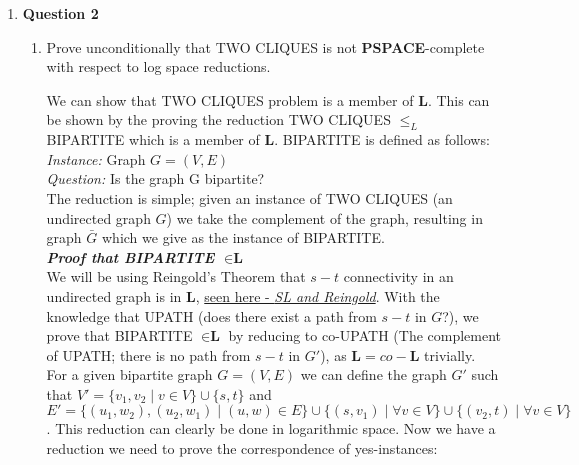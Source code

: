 \documentclass[12pt]{article}
\begin{document}
\begin{enumerate}
\begin{enumerate}
\end{enumerate}
\item \textbf{Question 2}
\begin{enumerate}
\item Prove unconditionally that TWO CLIQUES is not \textbf{PSPACE}-complete with respect to log space reductions.\par
We can show that TWO CLIQUES problem is a member of $\textbf{L} $. This can be shown by the proving the reduction TWO CLIQUES $\leq _{L}$ BIPARTITE which is a member of $\textbf{L} $. BIPARTITE is defined as follows:\\
\textit{Instance:} Graph $G=(V,E)$\\
\textit{Question:} Is the graph G bipartite?\\
The reduction is simple; given an instance of TWO CLIQUES (an undirected graph $G$) we take the complement of the graph, resulting in graph $\bar{G}$ which we give as the instance of BIPARTITE.\\
\textit{\textbf{Proof that BIPARTITE $\in \textbf{L} $}}\\
We will be using Reingold's Theorem that $s-t$ connectivity in an undirected graph is in $\textbf{L} $, \href{https://en.wikipedia.org/wiki/SL_(complexity)}{seen here - \textit{SL and Reingold}}. With the knowledge that UPATH (does there exist a path from $s-t$ in $G$?), we prove that BIPARTITE $\in \textbf{L} $ by reducing to co-UPATH (The complement of UPATH; there is no path from $s-t$ in $G'$), as $\textbf{L} = co-\textbf{L} $ trivially. \\
For a given bipartite graph $G=(V,E)$ we can define the graph $G'$ such that $V'=\{v_1,v_2\mid v \in V\} \cup \{s,t\} $ and $E'=\{(u_1,w_2),(u_2,w_1) \mid (u,w)\in E\} \cup \{(s,v_1) \mid \forall v \in V\} \cup \{(v_2,t) \mid \forall v \in V\}$.
This reduction can clearly be done in logarithmic space. Now we have a reduction we need to prove the correspondence of yes-instances: \\

\end{enumerate}
\end{enumerate}
\end{document}
